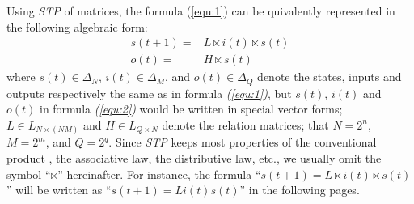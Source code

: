 Using {\em STP} of matrices, the formula (\ref{equ:1}) can be quivalently represented in the following algebraic form:
\begin{equation}
\begin{split}
s(t+1)=&L\ltimes{i(t)}\ltimes{s(t)}\\
o(t)=&H\ltimes{s(t)}
\end{split}
\label{equ:2}
\end{equation}
where $s(t)\in\Delta_N$, $i(t)\in\Delta_M$, and  $o(t)\in\Delta_Q$ denote the states, inputs and outputs respectively the same as in formula {\em (\ref{equ:1})}, but $s(t)$, $i(t)$ and $o(t)$ in formula {\em (\ref{equ:2})} would be written in special vector forms; $L\in L_{N\times\left(NM\right)}$ and $H\in L_{Q\times N}$ denote the relation matrices; that $N=2^n$, $M=2^m$, and $Q=2^q$. Since {\em STP} keeps most properties of the conventional product \cite{Cheng2011Analysis}, the associative law, the distributive law, etc., we usually omit the symbol ``$\ltimes$'' hereinafter. For instance, the 
formula ``$s(t+1)=L\ltimes{i(t)}\ltimes{s(t)}$'' will be written as ``$s(t+1)=L{i(t)}{s(t)}$'' in the following pages.

